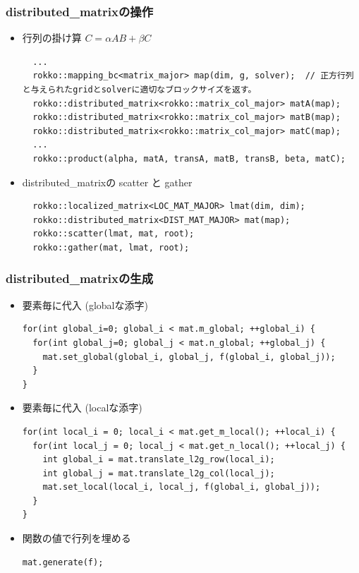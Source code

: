 \begin{frame}[c,fragile]
  \frametitle{distributed\_matrixの操作}
  \begin{itemize}
  \item 行列の掛け算 $C = \alpha A B + \beta C$
\begin{lstlisting}
  ...
  rokko::mapping_bc<matrix_major> map(dim, g, solver);  // 正方行列と与えられたgridとsolverに適切なブロックサイズを返す。
  rokko::distributed_matrix<rokko::matrix_col_major> matA(map);
  rokko::distributed_matrix<rokko::matrix_col_major> matB(map);
  rokko::distributed_matrix<rokko::matrix_col_major> matC(map);
  ...
  rokko::product(alpha, matA, transA, matB, transB, beta, matC);
\end{lstlisting}
  \item distributed\_matrixの scatter と gather
\begin{lstlisting}
  rokko::localized_matrix<LOC_MAT_MAJOR> lmat(dim, dim);
  rokko::distributed_matrix<DIST_MAT_MAJOR> mat(map);
  rokko::scatter(lmat, mat, root);
  rokko::gather(mat, lmat, root);
\end{lstlisting}
  \end{itemize}
\end{frame}

\begin{frame}[c,fragile]
  \frametitle{distributed_matrixの生成}
  \begin{itemize}
  \item 要素毎に代入 (globalな添字)
\begin{lstlisting}
for(int global_i=0; global_i < mat.m_global; ++global_i) {
  for(int global_j=0; global_j < mat.n_global; ++global_j) {
    mat.set_global(global_i, global_j, f(global_i, global_j));
  }
}
\end{lstlisting}
  \item 要素毎に代入 (localな添字)
\begin{lstlisting}
for(int local_i = 0; local_i < mat.get_m_local(); ++local_i) {
  for(int local_j = 0; local_j < mat.get_n_local(); ++local_j) {
    int global_i = mat.translate_l2g_row(local_i);
    int global_j = mat.translate_l2g_col(local_j);
    mat.set_local(local_i, local_j, f(global_i, global_j));
  }
}
\end{lstlisting}
  \item 関数の値で行列を埋める
\begin{lstlisting}
mat.generate(f);
\end{lstlisting}
  \end{itemize}
\end{frame}

